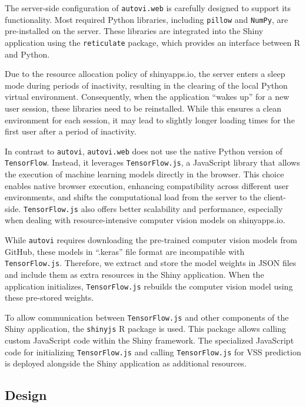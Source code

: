 \documentclass[
doublespace,
  times]{anzsauth}
\begin{document}
The server-side configuration of \texttt{autovi.web} is carefully
designed to support its functionality. Most required Python libraries,
including \texttt{pillow} and \texttt{NumPy}, are pre-installed on the
server. These libraries are integrated into the Shiny application using
the \texttt{reticulate} package, which provides an interface between R
and Python.

Due to the resource allocation policy of shinyapps.io, the server enters
a sleep mode during periods of inactivity, resulting in the clearing of
the local Python virtual environment. Consequently, when the application
``wakes up'' for a new user session, these libraries need to be
reinstalled. While this ensures a clean environment for each session, it
may lead to slightly longer loading times for the first user after a
period of inactivity.

In contrast to \texttt{autovi}, \texttt{autovi.web} does not use the
native Python version of \texttt{TensorFlow}. Instead, it leverages
\texttt{TensorFlow.js}, a JavaScript library that allows the execution
of machine learning models directly in the browser. This choice enables
native browser execution, enhancing compatibility across different user
environments, and shifts the computational load from the server to the
client-side. \texttt{TensorFlow.js} also offers better scalability and
performance, especially when dealing with resource-intensive computer
vision models on shinyapps.io.

While \texttt{autovi} requires downloading the pre-trained computer
vision models from GitHub, these models in ``.keras'' file format are
incompatible with \texttt{TensorFlow.js}. Therefore, we extract and
store the model weights in JSON files and include them as extra
resources in the Shiny application. When the application initializes,
\texttt{TensorFlow.js} rebuilds the computer vision model using these
pre-stored weights.

To allow communication between \texttt{TensorFlow.js} and other
components of the Shiny application, the \texttt{shinyjs} R package is
used. This package allows calling custom JavaScript code within the
Shiny framework. The specialized JavaScript code for initializing
\texttt{TensorFlow.js} and calling \texttt{TensorFlow.js} for VSS
prediction is deployed alongside the Shiny application as additional
resources.

\subsection{Design}\label{sec-autovi-web-design}
\end{document}
